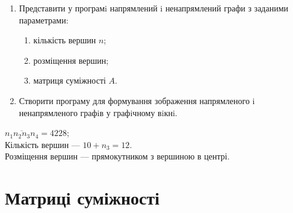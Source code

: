 
\def\basedir{/home/theammir/labs/asd/9/res}


\usepackage{graphicx}
\usepackage[hypcap=false]{caption}



\taskdesc%
\begin{enumerate}
  \item Представити у програмi напрямлений i ненапрямлений графи з заданими параметрами:
    \begin{enumerate}
      \item кількість вершин $n$;
      \item розміщення вершин;
      \item матриця суміжності $A$.
    \end{enumerate}
  \item Створити програму для формування зображення напрямленого i\\ ненапрямленого графiв у графiчному вiкнi.
\end{enumerate}

\taskspec%
$\overline{n_1 n_2 n_3 n_4} = 4228$;\\
Кількість вершин --- $10 + n_3 = 12$.\\
Розміщення вершин --- прямокутником з вершиною в центрі.


\section{Матриці суміжності}

